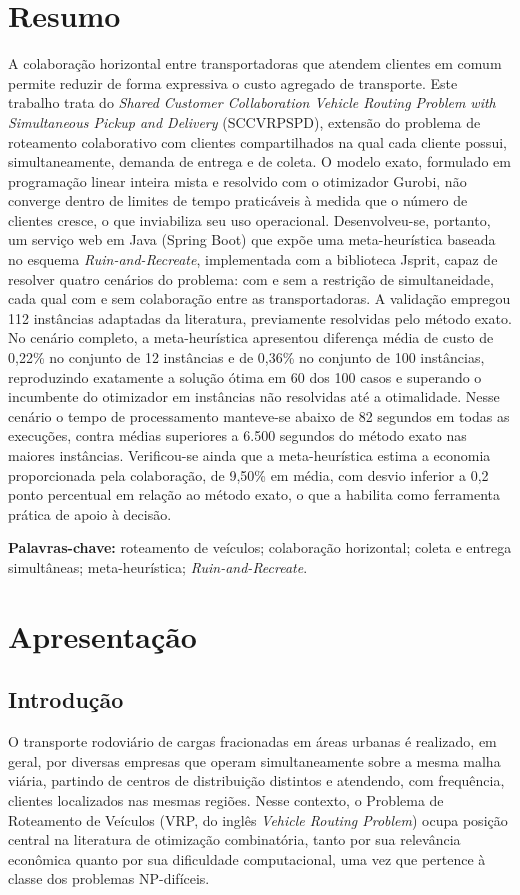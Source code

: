 \documentclass[a4paper,12pt]{article}
\begin{document}
\newpage
\tableofcontents
\newpage

\section{Resumo}
A colaboração horizontal entre transportadoras que atendem clientes em comum permite reduzir de forma expressiva o custo agregado de transporte. Este trabalho trata do \textit{Shared Customer Collaboration Vehicle Routing Problem with Simultaneous Pickup and Delivery} (SCCVRPSPD), extensão do problema de roteamento colaborativo com clientes compartilhados na qual cada cliente possui, simultaneamente, demanda de entrega e de coleta. O modelo exato, formulado em programação linear inteira mista e resolvido com o otimizador Gurobi, não converge dentro de limites de tempo praticáveis à medida que o número de clientes cresce, o que inviabiliza seu uso operacional. Desenvolveu-se, portanto, um serviço web em Java (Spring Boot) que expõe uma meta-heurística baseada no esquema \textit{Ruin-and-Recreate}, implementada com a biblioteca Jsprit, capaz de resolver quatro cenários do problema: com e sem a restrição de simultaneidade, cada qual com e sem colaboração entre as transportadoras. A validação empregou 112 instâncias adaptadas da literatura, previamente resolvidas pelo método exato. No cenário completo, a meta-heurística apresentou diferença média de custo de 0,22\% no conjunto de 12 instâncias e de 0,36\% no conjunto de 100 instâncias, reproduzindo exatamente a solução ótima em 60 dos 100 casos e superando o incumbente do otimizador em instâncias não resolvidas até a otimalidade. Nesse cenário o tempo de processamento manteve-se abaixo de 82 segundos em todas as execuções, contra médias superiores a 6.500 segundos do método exato nas maiores instâncias. Verificou-se ainda que a meta-heurística estima a economia proporcionada pela colaboração, de 9,50\% em média, com desvio inferior a 0,2 ponto percentual em relação ao método exato, o que a habilita como ferramenta prática de apoio à decisão.

\textbf{Palavras-chave: }roteamento de veículos; colaboração horizontal; coleta e entrega simultâneas; meta-heurística; \textit{Ruin-and-Recreate}.

\section{Apresentação}
\subsection{Introdução}
O transporte rodoviário de cargas fracionadas em áreas urbanas é realizado, em geral, por diversas empresas que operam simultaneamente sobre a mesma malha viária, partindo de centros de distribuição distintos e atendendo, com frequência, clientes localizados nas mesmas regiões. Nesse contexto, o Problema de Roteamento de Veículos (VRP, do inglês \textit{Vehicle Routing Problem}) ocupa posição central na literatura de otimização combinatória, tanto por sua relevância econômica quanto por sua dificuldade computacional, uma vez que pertence à classe dos problemas NP-difíceis.
\end{document}
